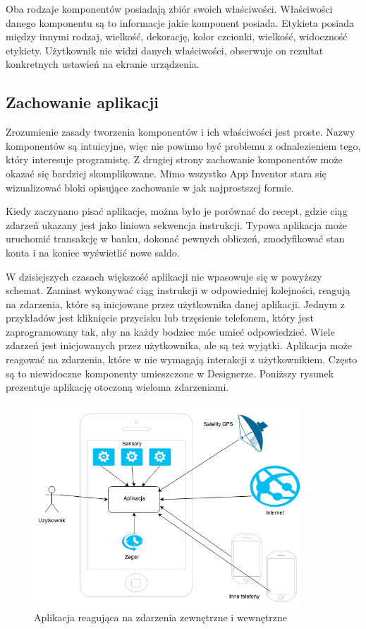 Oba rodzaje komponentów posiadają zbiór swoich właściwości. Właściwości danego komponentu są to informacje jakie komponent posiada. Etykieta posiada między innymi rodzaj, wielkość, dekorację, kolor czcionki, wielkość, widoczność etykiety. Użytkownik nie widzi danych właściwości, obserwuje on rezultat konkretnych ustawień na ekranie urządzenia.

\subsection{Zachowanie aplikacji}
\label{c322}
Zrozumienie zasady tworzenia komponentów i ich właściwości jest proste. Nazwy komponentów są intuicyjne, więc nie powinno być problemu z odnalezieniem tego, który interesuje programistę. Z drugiej strony zachowanie komponentów może okazać się bardziej skomplikowane. Mimo wszystko App Inventor stara się wizualizować bloki opisujące zachowanie w jak najprostszej formie.

Kiedy zaczynano pisać aplikacje, można było je porównać do recept, gdzie ciąg zdarzeń ukazany jest jako liniowa sekwencja instrukcji. Typowa aplikacja może uruchomić transakcję w banku, dokonać pewnych obliczeń, zmodyfikować stan konta i na koniec wyświetlić nowe saldo.\cite{appinventor:architektura}

W dzisiejszych czasach większość aplikacji nie wpasowuje się w powyższy schemat. Zamiast wykonywać ciąg instrukcji w odpowiedniej kolejności, reagują na zdarzenia, które są inicjowane przez użytkownika danej aplikacji. Jednym z przykładów jest kliknięcie przycisku lub trzęsienie telefonem, który jest zaprogramowany tak, aby na każdy bodziec móc umieć odpowiedzieć. Wiele zdarzeń jest inicjowanych przez użytkownika, ale są też wyjątki. Aplikacja może reagować na zdarzenia, które w nie wymagają interakcji z użytkownikiem. Często są to niewidoczne komponenty umieszczone w Designerze. Poniższy rysunek prezentuje aplikację otoczoną wieloma zdarzeniami.

\begin{figure}[th] 
\centering\includegraphics[width=10cm]{figures/events}
\caption{Aplikacja reagująca na zdarzenia zewnętrzne i wewnętrzne\cite{appinventor:architektura}}
\end{figure}

